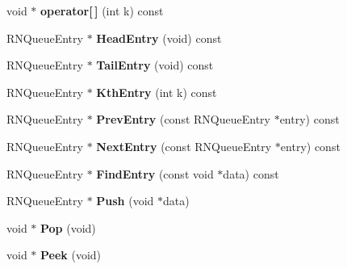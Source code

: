 \begin{DoxyCompactItemize}
\item 
void $\ast$ {\bfseries operator\mbox{[}$\,$\mbox{]}} (int k) const \hypertarget{class_r_n_v_queue_aafe67ff19ef6e4ea570e8352a8e470fc}{}\label{class_r_n_v_queue_aafe67ff19ef6e4ea570e8352a8e470fc}

\item 
R\+N\+Queue\+Entry $\ast$ {\bfseries Head\+Entry} (void) const \hypertarget{class_r_n_v_queue_a84ed91a8da3f7bb8d2fa3417076bb9e9}{}\label{class_r_n_v_queue_a84ed91a8da3f7bb8d2fa3417076bb9e9}

\item 
R\+N\+Queue\+Entry $\ast$ {\bfseries Tail\+Entry} (void) const \hypertarget{class_r_n_v_queue_a2b1dcfec5458146a45d24d8153822326}{}\label{class_r_n_v_queue_a2b1dcfec5458146a45d24d8153822326}

\item 
R\+N\+Queue\+Entry $\ast$ {\bfseries Kth\+Entry} (int k) const \hypertarget{class_r_n_v_queue_ae6e8d0fe321a8fc2e146d0f2af0cfbe9}{}\label{class_r_n_v_queue_ae6e8d0fe321a8fc2e146d0f2af0cfbe9}

\item 
R\+N\+Queue\+Entry $\ast$ {\bfseries Prev\+Entry} (const R\+N\+Queue\+Entry $\ast$entry) const \hypertarget{class_r_n_v_queue_ac8f489ea6765a5af7c420f523e3ef207}{}\label{class_r_n_v_queue_ac8f489ea6765a5af7c420f523e3ef207}

\item 
R\+N\+Queue\+Entry $\ast$ {\bfseries Next\+Entry} (const R\+N\+Queue\+Entry $\ast$entry) const \hypertarget{class_r_n_v_queue_a0097d5c52f87f2eed38acd7d31a38160}{}\label{class_r_n_v_queue_a0097d5c52f87f2eed38acd7d31a38160}

\item 
R\+N\+Queue\+Entry $\ast$ {\bfseries Find\+Entry} (const void $\ast$data) const \hypertarget{class_r_n_v_queue_af2d05520a55ac55983d2c0feac15ac16}{}\label{class_r_n_v_queue_af2d05520a55ac55983d2c0feac15ac16}

\item 
R\+N\+Queue\+Entry $\ast$ {\bfseries Push} (void $\ast$data)\hypertarget{class_r_n_v_queue_abff8171202a8292eb4ab8d2855964886}{}\label{class_r_n_v_queue_abff8171202a8292eb4ab8d2855964886}

\item 
void $\ast$ {\bfseries Pop} (void)\hypertarget{class_r_n_v_queue_ac8385aaed7abcd7064d4a1322788bf08}{}\label{class_r_n_v_queue_ac8385aaed7abcd7064d4a1322788bf08}

\item 
void $\ast$ {\bfseries Peek} (void)\hypertarget{class_r_n_v_queue_adf2e07b51b12ecd06e1688668c757c89}{}\label{class_r_n_v_queue_adf2e07b51b12ecd06e1688668c757c89}


\end{DoxyCompactItemize}
